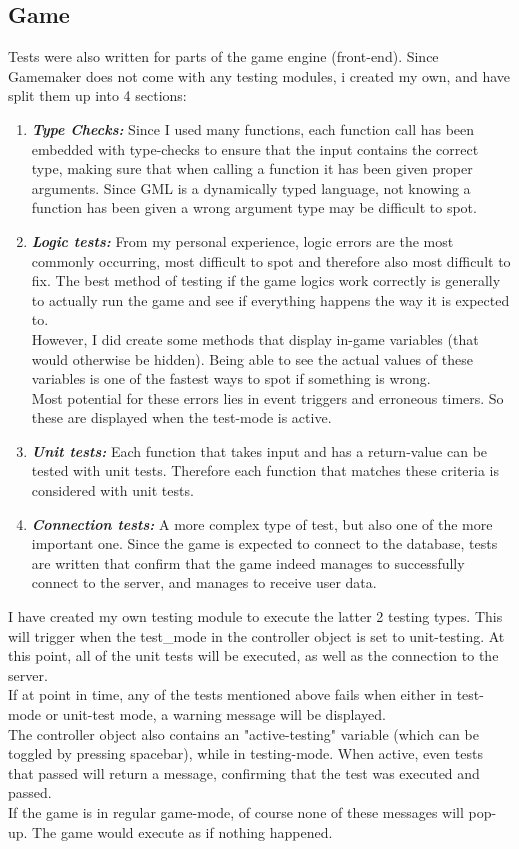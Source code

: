 \documentclass[12pt]{report}
\begin{document}
\subsection*{Game}
Tests were also written for parts of the game engine (front-end). Since Gamemaker does not come with any testing modules, i created my own, and have split them up into 4 sections:
\begin{enumerate}
\item \emph{\textbf{Type Checks:}} Since I used many functions, each function call has been embedded with type-checks to ensure that the input contains the correct type, making sure that when calling a function it has been given proper arguments. Since GML is a dynamically typed language, not knowing a function has been given a wrong argument type may be difficult to spot.
\item \emph{\textbf{Logic tests:}} From my personal experience, logic errors are the most commonly occurring, most difficult to spot and therefore also most difficult to fix. The best method of testing if the game logics work correctly is generally to actually run the game and see if everything happens the way it is expected to.\\
However, I did create some methods that display in-game variables (that would otherwise be hidden). Being able to see the actual values of these variables is one of the fastest ways to spot if something is wrong.\\
Most potential for these errors lies in event triggers and erroneous timers. So these are displayed when the test-mode is active.
\item \emph{\textbf{Unit tests:}} Each function that takes input and has a return-value can be tested with unit tests. Therefore each function that matches these criteria is considered with unit tests.
\item \emph{\textbf{Connection tests:}} A more complex type of test, but also one of the more important one. Since the game is expected to connect to the database, tests are written that confirm that the game indeed manages to successfully connect to the server, and manages to receive user data.
\end{enumerate}
I have created my own testing module to execute the latter 2 testing types. This will trigger when the test\_mode in the controller object is set to unit-testing. At this point, all of the unit tests will be executed, as well as the connection to the server.\\
If at point in time, any of the tests mentioned above fails when either in test-mode or unit-test mode, a warning message will be displayed.\\
The controller object also contains an "active-testing" variable (which can be toggled by pressing spacebar), while in testing-mode. When active, even tests that passed will return a message, confirming that the test was executed and passed.\\
If the game is in regular game-mode, of course none of these messages will pop-up. The game would execute as if nothing happened.
\end{document}
